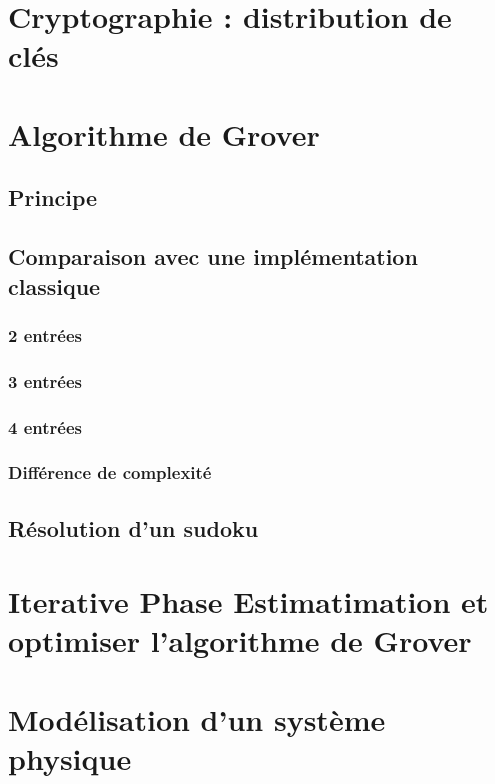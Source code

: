 \chapter{Cryptographie : distribution de clés}

\chapter{Algorithme de Grover}

\section{Principe}

\section{Comparaison avec une implémentation classique}
\subsection{2 entrées}

\subsection{3 entrées}

\subsection{4 entrées}

\subsection{Différence de complexité}

\section{Résolution d'un sudoku}

\chapter{Iterative Phase Estimatimation et optimiser l'algorithme de Grover}

\chapter{Modélisation d'un système physique}
